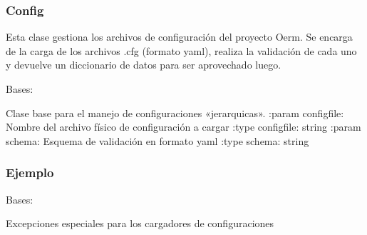 \documentclass[a4paper,12pt,spanish]{sphinxmanual}
\begin{document}
\subsubsection{Config}
\label{\detokenize{openerm.Config:id1}}\label{\detokenize{openerm.Config::doc}}
Esta clase gestiona los archivos de configuración del proyecto Oerm. Se encarga
de la carga de los archivos .cfg (formato yaml), realiza la validación de cada
uno y devuelve un diccionario de datos para ser aprovechado luego.

\begin{fulllineitems}
\label{\detokenize{openerm.Config:openerm.Config.Config}}
Bases: 

Clase base para el manejo de configuraciones «jerarquicas».
:param configfile: Nombre del archivo físico de configuración a cargar
:type configfile: string
:param schema: Esquema de validación en formato yaml
:type schema: string
\subsubsection*{Ejemplo}

\begin{sphinxVerbatim}[commandchars=\\\{\}]
   
   
\end{sphinxVerbatim}

\end{fulllineitems}


\begin{fulllineitems}
\label{\detokenize{openerm.Config:openerm.Config.ConfigLoadingException}}
Bases: 

Excepciones especiales para los cargadores de configuraciones

\end{fulllineitems}
\end{document}
